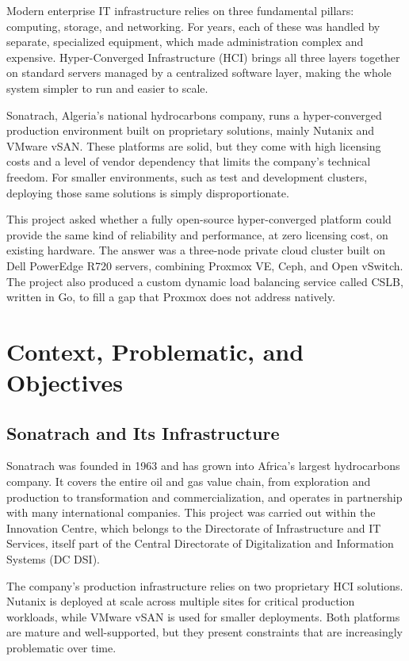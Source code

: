 \documentclass[12pt, a4paper]{article}
\begin{document}
Modern enterprise IT infrastructure relies on three fundamental pillars: computing, storage, and networking. For years, each of these was handled by separate, specialized equipment, which made administration complex and expensive. Hyper-Converged Infrastructure (HCI) brings all three layers together on standard servers managed by a centralized software layer, making the whole system simpler to run and easier to scale.

Sonatrach, Algeria's national hydrocarbons company, runs a hyper-converged production environment built on proprietary solutions, mainly Nutanix and VMware vSAN. These platforms are solid, but they come with high licensing costs and a level of vendor dependency that limits the company's technical freedom. For smaller environments, such as test and development clusters, deploying those same solutions is simply disproportionate.

This project asked whether a fully open-source hyper-converged platform could provide the same kind of reliability and performance, at zero licensing cost, on existing hardware. The answer was a three-node private cloud cluster built on Dell PowerEdge R720 servers, combining Proxmox VE, Ceph, and Open vSwitch. The project also produced a custom dynamic load balancing service called CSLB, written in Go, to fill a gap that Proxmox does not address natively.

\section{Context, Problematic, and Objectives}

\subsection{Sonatrach and Its Infrastructure}

Sonatrach was founded in 1963 and has grown into Africa's largest hydrocarbons company. It covers the entire oil and gas value chain, from exploration and production to transformation and commercialization, and operates in partnership with many international companies. This project was carried out within the Innovation Centre, which belongs to the Directorate of Infrastructure and IT Services, itself part of the Central Directorate of Digitalization and Information Systems (DC DSI).

The company's production infrastructure relies on two proprietary HCI solutions. Nutanix is deployed at scale across multiple sites for critical production workloads, while VMware vSAN is used for smaller deployments. Both platforms are mature and well-supported, but they present constraints that are increasingly problematic over time.
\end{document}
